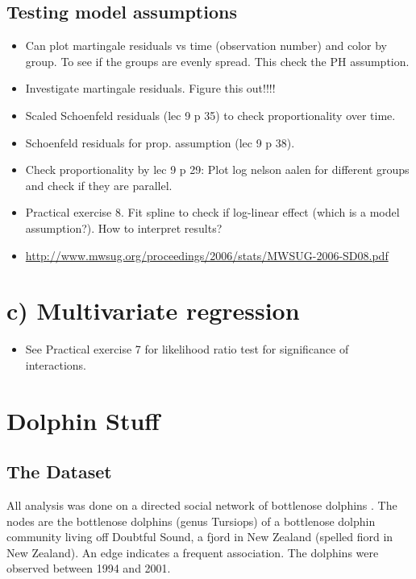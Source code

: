 \documentclass[11pt,a4paper]{article}
\begin{document}
\subsection{Testing model assumptions}

\begin{itemize}
    \item Can plot martingale residuals vs time (observation number) and color by group. To see if the groups are evenly spread. This check the PH assumption.
    \item Investigate martingale residuals. Figure this out!!!!
    \item Scaled Schoenfeld residuals (lec 9 p 35) to check proportionality over time.
    \item Schoenfeld residuals for prop. assumption (lec 9 p 38).
    \item Check proportionality by lec 9 p 29: Plot log nelson aalen for different groups and check if they are parallel.
    \item Practical exercise 8. Fit spline to check if log-linear effect (which is a model assumption?). How to interpret results?
    \item \url{http://www.mwsug.org/proceedings/2006/stats/MWSUG-2006-SD08.pdf}
\end{itemize}



\section{c) Multivariate regression}
\begin{itemize}
    \item See Practical exercise 7 for likelihood ratio test for significance of interactions.
\end{itemize}












\clearpage
\section{Dolphin Stuff}

\subsection{The Dataset}

All analysis was done on a directed social network of bottlenose dolphins \citep{dolphins}. The nodes are the bottlenose dolphins (genus Tursiops) of a bottlenose dolphin community living off Doubtful Sound, a fjord in New Zealand (spelled fiord in New Zealand). An edge indicates a frequent association. The dolphins were observed between 1994 and 2001.
\end{document}
